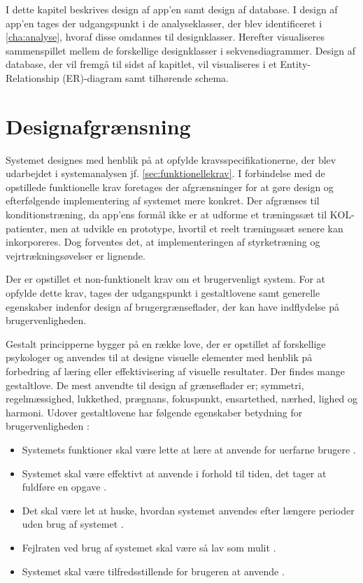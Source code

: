 I dette kapitel beskrives design af app'en samt design af database. I design af app'en tages der udgangspunkt i de analyseklasser, der blev identificeret i \autoref{cha:analyse}, hvoraf disse omdannes til designklasser. Herefter visualiseres sammenspillet mellem de forskellige designklasser i sekvensdiagrammer. Design af database, der vil fremgå til sidst af kapitlet, vil visualiseres i et Entity-Relationship (ER)-diagram samt tilhørende schema. 

\section{Designafgrænsning} \label{sec:brugervenlighed}
Systemet designes med henblik på at opfylde kravsspecifikationerne, der blev udarbejdet i systemanalysen jf. \autoref{sec:funktionellekrav}. I forbindelse med de opstillede funktionelle krav foretages der afgrænsninger for at gøre design og efterfølgende implementering af systemet mere konkret. Der afgrænses til konditionstræning, da app'ens formål ikke er at udforme et træningssæt til KOL-patienter, men at udvikle en prototype, hvortil et reelt træningssæt senere kan inkorporeres. Dog forventes det, at implementeringen af styrketræning og vejrtrækningsøvelser er lignende. 

Der er opstillet et non-funktionelt krav om et brugervenligt system. For at opfylde dette krav, tages der udgangspunkt i gestaltlovene samt generelle egenskaber indenfor design af brugergrænseflader, der kan have indflydelse på brugervenligheden. 

Gestalt principperne bygger på en række love, der er opstillet af forskellige psykologer og anvendes til at designe visuelle elementer med henblik på forbedring af læring eller effektivisering af visuelle resultater. Der findes mange gestaltlove. De mest anvendte til design af grænseflader er; symmetri, regelmæssighed, lukkethed, prægnans, fokuspunkt, ensartethed, nærhed, lighed og harmoni.\cite{Chang2002} Udover gestaltlovene har følgende egenskaber betydning for brugervenligheden \cite{ferre2001}:
\begin{itemize}
\item Systemets funktioner skal være lette at lære at anvende for uerfarne brugere \cite{ferre2001}.
\item Systemet skal være effektivt at anvende i forhold til tiden, det tager at fuldføre en opgave \cite{ferre2001}.
\item Det skal være let at huske, hvordan systemet anvendes efter længere perioder uden brug af systemet \cite{ferre2001}.
\item Fejlraten ved brug af systemet skal være så lav som mulit \cite{ferre2001}.
\item Systemet skal være tilfredsstillende for brugeren at anvende \cite{ferre2001}.
\end{itemize}
 

 





